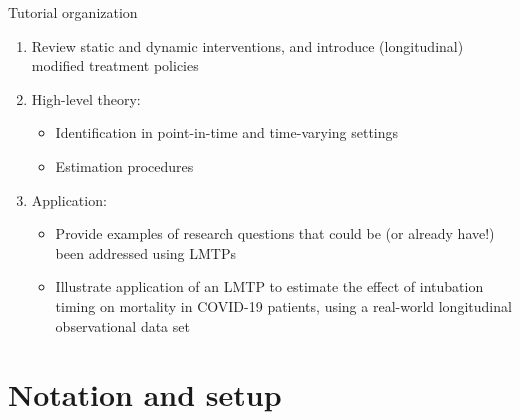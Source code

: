 \documentclass[
  10pt,
  ignorenonframetext,
]{beamer}
\providecommand{\tightlist}{%
  \setlength{\itemsep}{0pt}\setlength{\parskip}{0pt}}\usepackage{longtable,booktabs,array}
\begin{document}
\begin{frame}{Tutorial organization}
\protect\hypertarget{tutorial-organization}{}
\begin{enumerate}
\item
  Review static and dynamic interventions, and introduce (longitudinal)
  modified treatment policies
\item
  High-level theory:

  \begin{itemize}
  \tightlist
  \item
    Identification in point-in-time and time-varying settings
  \item
    Estimation procedures
  \end{itemize}
\item
  Application:

  \begin{itemize}
  \tightlist
  \item
    Provide examples of research questions that could be (or already
    have!) been addressed using LMTPs
  \item
    Illustrate application of an LMTP to estimate the effect of
    intubation timing on mortality in COVID-19 patients, using a
    real-world longitudinal observational data set
  \end{itemize}
\end{enumerate}
\end{frame}

\hypertarget{notation-and-setup}{%
\section{Notation and setup}\label{notation-and-setup}}
\end{document}
